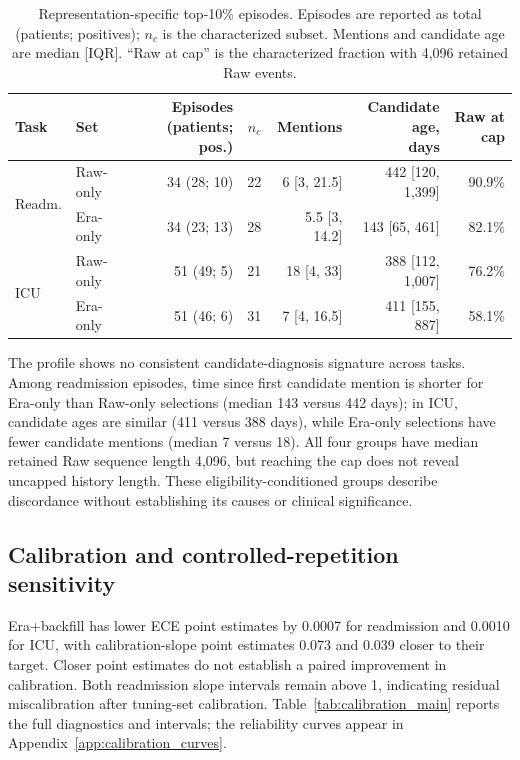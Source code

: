\documentclass{article}
\newcommand{\topten}{top-10\%}
\begin{document}
\begin{table}[!htbp]
  \caption{Representation-specific \topten{} episodes. Episodes are reported as
  total (patients; positives); $n_c$ is the characterized subset. Mentions and
  candidate age are median [IQR]. ``Raw at cap'' is the characterized fraction
  with 4,096 retained Raw events.}
  \label{tab:discordant_characterization}
  \centering
  \footnotesize
  \begin{tabular*}{\linewidth}{@{\extracolsep{\fill}}llrrrrr@{}}
    \toprule
    Task & Set & Episodes (patients; pos.) & $n_c$ & Mentions & \shortstack{Candidate age,\\days} & Raw at cap \\
    \midrule
    \multirow{2}{*}{Readm.}
      & Raw-only & 34 (28; 10) & 22 & 6 [3, 21.5] & 442 [120, 1,399] & 90.9\% \\
      & Era-only & 34 (23; 13) & 28 & 5.5 [3, 14.2] & 143 [65, 461] & 82.1\% \\
    \midrule
    \multirow{2}{*}{ICU}
      & Raw-only & 51 (49; 5) & 21 & 18 [4, 33] & 388 [112, 1,007] & 76.2\% \\
      & Era-only & 51 (46; 6) & 31 & 7 [4, 16.5] & 411 [155, 887] & 58.1\% \\
    \bottomrule
  \end{tabular*}
\end{table}

The profile shows no consistent candidate-diagnosis signature across tasks. Among
readmission episodes, time since first candidate mention is shorter for
Era-only than Raw-only selections (median 143 versus 442 days); in ICU,
candidate ages are similar (411 versus 388 days), while Era-only selections
have fewer candidate mentions (median 7 versus 18). All four groups have
median retained Raw sequence length 4,096, but reaching the cap does not reveal
uncapped history length. These eligibility-conditioned groups describe
discordance without establishing its causes or clinical significance.

\FloatBarrier

\subsection{Calibration and controlled-repetition sensitivity}

Era+backfill has lower ECE point estimates by 0.0007 for readmission and 0.0010
for ICU, with calibration-slope point estimates 0.073 and 0.039 closer to their
target. Closer point estimates do not establish a paired improvement in
calibration. Both readmission slope intervals remain above 1, indicating
residual miscalibration after tuning-set calibration.
Table~\ref{tab:calibration_main} reports the full diagnostics and intervals;
the reliability curves appear in Appendix~\ref{app:calibration_curves}.
\end{document}
